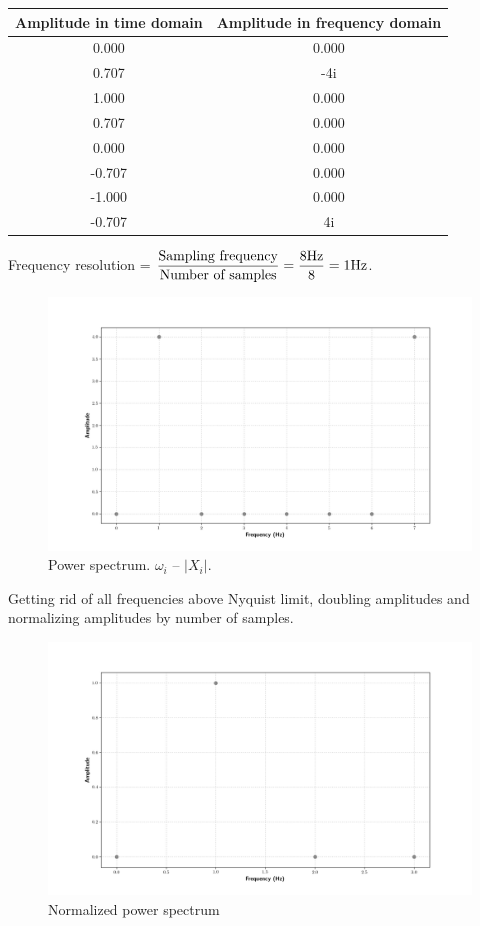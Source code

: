 \documentclass[14pt]{article}
\begin{document}
\begin{center}
\begin{tabular}{cc}
	\toprule
	Amplitude in time domain & Amplitude in frequency domain \\
	\midrule 
	0.000 & 0.000 \\
	0.707 & -4i \\
	1.000 & 0.000 \\
	0.707 & 0.000 \\
	0.000 & 0.000 \\
       -0.707 & 0.000 \\
       -1.000 & 0.000\\
       -0.707 & 4i \\
	\bottomrule
\end{tabular}
\end{center}

Frequency resolution = $\displaystyle \frac{\textup{Sampling frequency}}{\textup{Number of samples}} = \frac{8 \textup{Hz}}{8} = 1 \textup{Hz}$. 
\begin{figure}[!h]
	\includegraphics[width = \linewidth]{pictures/power_spectrum.png}
	\caption{Power spectrum. $\omega_i$ -- $|X_i|$.}
\end{figure}

Getting rid of all frequencies above Nyquist limit, doubling amplitudes and normalizing amplitudes by number of samples.

\begin{figure}[!h]
	\includegraphics[width = \linewidth]{pictures/true_spectra.png}
	\caption{Normalized power spectrum}
\end{figure}
\end{document}
